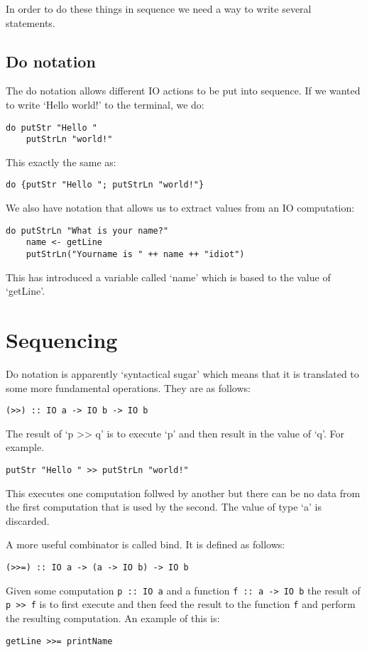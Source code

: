 \documentclass[11pt,a4paper,titlepage]{scrartcl}
\begin{document}
In order to do these things in sequence we need a way to write several
statements.
\subsection{Do notation}%
\label{sub:do}

The do notation allows different IO actions to be put into sequence. If we
wanted to write `Hello world!' to the terminal, we do:
\begin{lstlisting}
do putStr "Hello "
    putStrLn "world!"
\end{lstlisting}
This exactly the same as:
\begin{lstlisting}
do {putStr "Hello "; putStrLn "world!"}
\end{lstlisting}

We also have notation that allows us to extract values from an IO
computation:
\begin{lstlisting}
do putStrLn "What is your name?"
    name <- getLine
    putStrLn("Yourname is " ++ name ++ "idiot")
\end{lstlisting}

This has introduced a variable called `name' which is based to the value
of `getLine'.

\section{Sequencing}%
\label{sec:Sequencing}
Do notation is apparently `syntactical sugar' which means that it is
translated to some more fundamental operations. They are as follows:
\begin{lstlisting}
(>>) :: IO a -> IO b -> IO b
\end{lstlisting}
The result of `p >> q' is to execute `p' and then result in the value of
`q'. For example.
\begin{lstlisting}
putStr "Hello " >> putStrLn "world!"
\end{lstlisting}

This executes one computation follwed by another but there can be no data
from the first computation that is used by the second. The value of type
`a' is discarded.

A more useful combinator is called bind. It is defined as follows:
\begin{lstlisting}
(>>=) :: IO a -> (a -> IO b) -> IO b
\end{lstlisting}

Given some computation \lstinline|p :: IO a| and a function
\lstinline|f :: a -> IO b| the result of \lstinline|p >> f| is to first
execute and then feed the result to the function \lstinline|f| and perform
the resulting computation. An example of this is:
\begin{lstlisting}
getLine >>= printName
\end{lstlisting}
\end{document}
